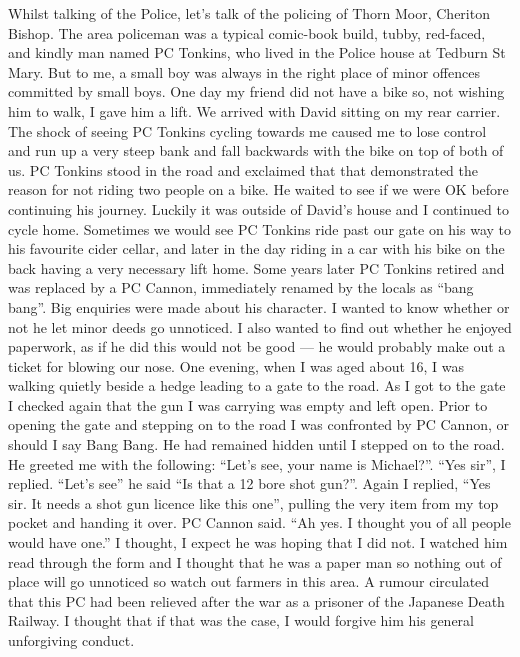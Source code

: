 Whilst talking of the Police, let's talk of the policing of Thorn Moor, Cheriton
Bishop. The area policeman was a typical comic-book build, tubby, red-faced,
and kindly man named PC Tonkins, who lived in the Police house at Tedburn St
Mary. But to me, a small boy was always in the right place of minor offences
committed by small boys. One day my friend did not have a bike so, not wishing
him to walk, I gave him a lift. We arrived with David sitting on my rear
carrier. The shock of seeing PC Tonkins cycling towards me caused me to lose
control and run up a very steep bank and fall backwards with the bike on top of
both of us. PC Tonkins stood in the road and exclaimed that that demonstrated
the reason for not riding two people on a bike. He waited to see if we were OK
before continuing his journey. Luckily it was outside of David's house and I
continued to cycle home. Sometimes we would see PC Tonkins ride past our gate
on his way to his favourite cider cellar, and later in the day riding in a car
with his bike on the back having a very necessary lift home. Some years later
PC Tonkins retired and was replaced by a PC Cannon, immediately renamed by the
locals as ``bang bang''. Big enquiries were made about his character. I wanted
to know whether or not he let minor deeds go unnoticed. I also wanted to find
out whether he enjoyed paperwork, as if he did this would not be good --- he
would probably make out a ticket for blowing our nose. One evening, when I was
aged about 16, I was walking quietly beside a hedge leading to a gate to the
road. As I got to the gate I checked again that the gun I was carrying was
empty and left open. Prior to opening the gate and stepping on to the road I
was confronted by PC Cannon, or should I say Bang Bang. He had remained hidden
until I stepped on to the road. He greeted me with the following: ``Let's see,
your name is Michael?''. ``Yes sir'', I replied. ``Let's see'' he said ``Is
that a 12 bore shot gun?''. Again I replied, ``Yes sir. It needs a shot gun
licence like this one'', pulling the very item from my top pocket and handing
it over. PC Cannon said. ``Ah yes. I thought you of all people would have
one.'' I thought, I expect he was hoping that I did not. I watched him read
through the form and I thought that he was a paper man so nothing out of place
will go unnoticed so watch out farmers in this area. A rumour circulated that
this PC had been relieved after the war as a prisoner of the Japanese Death
Railway. I thought that if that was the case, I would forgive him his general
unforgiving conduct.

